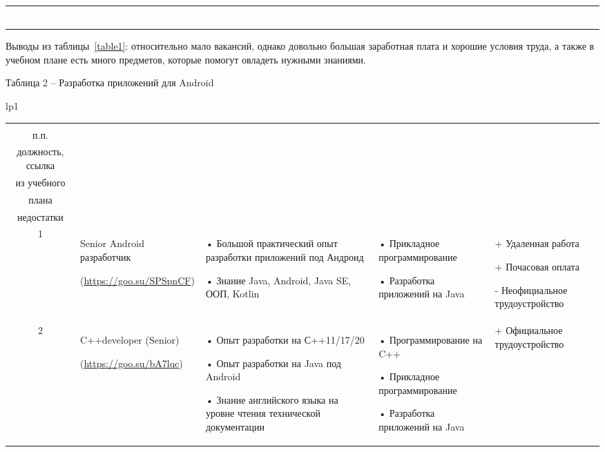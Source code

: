 \documentclass[14pt]{extreport}
\begin{document}
\begin{landscape}
\begin{longtable}[H]{lp{1\linewidth}}
\begin{small}
\begin{tabular}{|c|p{}|p{6cm}|p{5cm}|p{5cm}|}
	\hline

    \end{tabular}
    \end{small}
\end{longtable}

Выводы из таблицы~\ref{table1}: относительно мало вакансий, однако довольно большая заработная плата и хорошие условия труда, а также в учебном плане есть много предметов, которые помогут овладеть нужными знаниями.




\newpage
Таблица 2 – Разработка приложений для Android
\begin{longtable}[H]{lp{1\linewidth}}

\caption{Разработка приложений для  \label{table2}}


\centering

\begin{small}


    \begin{tabular}{|c|p{}|p{6cm}|p{5cm}|p{5cm}|}
	\hline 
	\makecell{№ \\ п.п.} &	\makecell{Наименование,\\ должность, ссылка} &	\makecell{Требования} & 	\makecell{Дисциплины \\ из учебного \\плана} &	\makecell{Преимущества и \\недостатки}  \\ 
	\hline 
	1	& Senior Android разработчик
	
(\url{https://goo.su/SPSpnCF}) &
•	Большой практический опыт разработки приложений под Андроид

•	Знание Java, Android, Java SE, ООП, Kotlin &
•	Прикладное программирование

•	Разработка приложений на Java &
+	Удаленная работа


+	Почасовая оплата

-	Неофициальное трудоустройство \\

	\hline
	2	& C++developer (Senior)
	
(\url{https://goo.su/bA7lqc}) &
•	Опыт разработки на С++11/17/20

•	Опыт разработки на Java под Android 

•	Знание английского языка на уровне чтения технической документации &
•	Программирование на C++

•	Прикладное программирование

•	Разработка приложений на Java &
+	Официальное трудоустройство 


\end{tabular}
\end{small}
\end{longtable}
\end{landscape}
\end{document}
